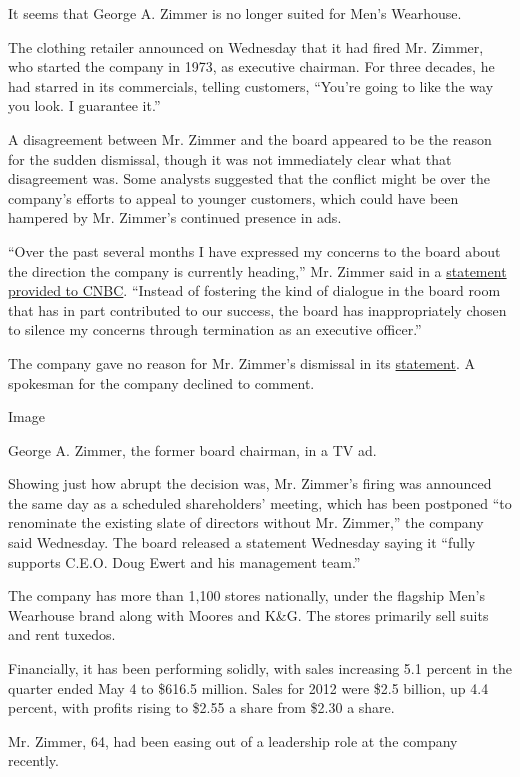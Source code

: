 It seems that George A. Zimmer is no longer suited for Men's Wearhouse.

The clothing retailer announced on Wednesday that it had fired Mr.
Zimmer, who started the company in 1973, as executive chairman. For
three decades, he had starred in its commercials, telling customers,
``You're going to like the way you look. I guarantee it.''

A disagreement between Mr. Zimmer and the board appeared to be the
reason for the sudden dismissal, though it was not immediately clear
what that disagreement was. Some analysts suggested that the conflict
might be over the company's efforts to appeal to younger customers,
which could have been hampered by Mr. Zimmer's continued presence in
ads.

``Over the past several months I have expressed my concerns to the board
about the direction the company is currently heading,'' Mr. Zimmer said
in a \href{http://www.cnbc.com/id/100828607}{statement provided to
CNBC}. ``Instead of fostering the kind of dialogue in the board room
that has in part contributed to our success, the board has
inappropriately chosen to silence my concerns through termination as an
executive officer.''

The company gave no reason for Mr. Zimmer's dismissal in its
\href{http://phx.corporate-ir.net/phoenix.zhtml?c=109554\&p=irol-newsArticle_Print\&ID=1831249\&highlight=}{statement}.
A spokesman for the company declined to comment.

Image

George A. Zimmer, the former board chairman, in a TV ad.

Showing just how abrupt the decision was, Mr. Zimmer's firing was
announced the same day as a scheduled shareholders' meeting, which has
been postponed ``to renominate the existing slate of directors without
Mr. Zimmer,'' the company said Wednesday. The board released a statement
Wednesday saying it ``fully supports C.E.O. Doug Ewert and his
management team.''

The company has more than 1,100 stores nationally, under the flagship
Men's Wearhouse brand along with Moores and K\&G. The stores primarily
sell suits and rent tuxedos.

Financially, it has been performing solidly, with sales increasing 5.1
percent in the quarter ended May 4 to \$616.5 million. Sales for 2012
were \$2.5 billion, up 4.4 percent, with profits rising to \$2.55 a
share from \$2.30 a share.

Mr. Zimmer, 64, had been easing out of a leadership role at the company
recently.

